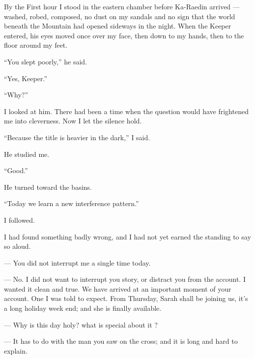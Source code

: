 By the First hour I stood in the eastern chamber before Ka-Raedin arrived --- washed, robed, composed, no dust on my sandals and no sign that the world beneath the Mountain had opened sideways in the night. When the Keeper entered, his eyes moved once over my face, then down to my hands, then to the floor around my feet.\par

``You slept poorly,'' he said.\par

``Yes, Keeper.''\par

``Why?''\par

I looked at him. There had been a time when the question would have frightened me into cleverness. Now I let the silence hold.\par

``Because the title is heavier in the dark,'' I said.\par

He studied me.\par

``Good.''\par

He turned toward the basins.\par

``Today we learn a new interference pattern.''\par

I followed.\par

I had found something badly wrong, and I had not yet earned the standing to say so aloud.\par

\begin{room}

--- You did not interrupt me a single time today.

--- No. I did not want to interrupt you story, or distract you from the account. I wanted it clean and true. We have arrived at an important moment of your account. One I was told to expect. From Thursday, Sarah shall be joining us, it's a long holiday week end; and she is finally available.

--- Why is this day holy? what is special about it ?

--- It has to do with the man you saw on the cross; and it is long and hard to explain. 

\end{room}